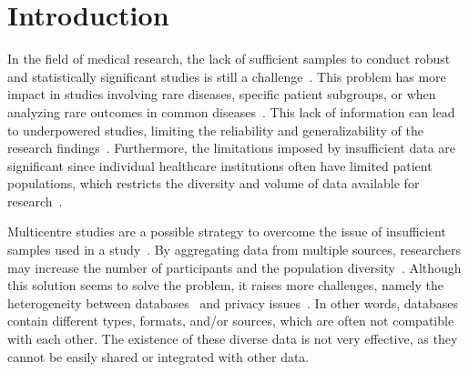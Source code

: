 \chapter{Introduction}
\label{chapter:Introduction}

%
% 
%


In the field of medical research, the lack of sufficient samples to conduct robust and statistically significant studies is still a challenge~\cite{rogers2021clinical}. This problem has more impact in studies involving rare diseases, specific patient subgroups, or when analyzing rare outcomes in common diseases~\cite{topaloglu2018using}. This lack of information can lead to underpowered studies, limiting the reliability and generalizability of the research findings~\cite{lombardo2023electronic}. Furthermore, the limitations imposed by insufficient data are significant since individual healthcare institutions often have limited patient populations, which restricts the diversity and volume of data available for research~\cite{rogers2021clinical,lombardo2023electronic}.

Multicentre studies are a possible strategy to overcome the issue of insufficient samples used in a study~\cite{almeida2021methodology}. By aggregating data from multiple sources, researchers may increase the number of participants and the population diversity~\cite{kaelber2008research}. Although this solution seems to solve the problem, it raises more challenges, namely the heterogeneity between databases~\cite{pereira2023querying} and privacy issues~\cite{almeida2022secure}. In other words, databases contain different types, formats, and/or sources, which are often not compatible with each other. The existence of these diverse data is not very effective, as they cannot be easily shared or integrated with other data.


